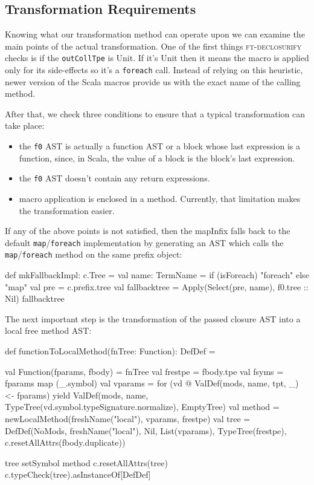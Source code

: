 \subsection{Transformation Requirements}

Knowing what our transformation method can operate upon we can examine the
main points of the actual transformation. One of the first things \textsc{ft-declosurify}
checks is if the \texttt{outCollTpe} is Unit. If it's Unit then
it means the macro is applied only for its side-effects so it's a \texttt{foreach} call.
Instead of relying on this heuristic, newer version of the Scala macros provide
us with the exact name of the calling method.

After that, we check three conditions to ensure that a typical
transformation can take place:
\begin{itemize}
 \item
  the \texttt{f0} AST is actually a function AST or a block whose last
expression is a function, since, in Scala, the value of a block is the block's
last expression.
 \item
    the \texttt{f0} AST doesn't contain any return expressions.
 \item
    macro application is enclosed in a method. Currently, that limitation makes
the transformation easier.
\end{itemize}

If any of the above points is not satisfied, then the mapInfix falls back to the
default \texttt{map}/\texttt{foreach} implementation by generating an AST which
calls the \texttt{map}/\texttt{foreach} method on the same prefix object:

\begin{scalaCode}
def mkFallbackImpl: c.Tree = {
  val name: TermName = if (isForeach) "foreach" else "map"
  val pre = c.prefix.tree
  val fallbacktree = Apply(Select(pre, name), f0.tree :: Nil)
  fallbacktree
}
\end{scalaCode}


The next important step is the transformation of the passed closure AST
into a local free method AST:

\begin{scalaCode}
def functionToLocalMethod(fnTree: Function): DefDef = {
  val Function(fparams, fbody) = fnTree
  val frestpe = fbody.tpe
  val fsyms   = fparams map (_.symbol)
  val vparams = for (vd @ ValDef(mods, name, tpt, _) <- fparams) yield ValDef(mods, name, TypeTree(vd.symbol.typeSignature.normalize), EmptyTree)
  val method  = newLocalMethod(freshName("local"), vparams, frestpe)
  val tree    = DefDef(NoMods, freshName("local"), Nil, List(vparams), TypeTree(frestpe), c.resetAllAttrs(fbody.duplicate))

  tree setSymbol method
  c.resetAllAttrs(tree)
  c.typeCheck(tree).asInstanceOf[DefDef]
}
\end{scalaCode}

